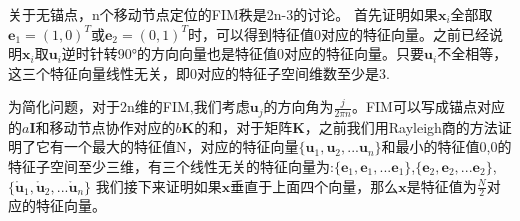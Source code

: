\documentclass[12pt]{article}
\theoremstyle{remark}
\begin{document}
关于无锚点，n个移动节点定位的FIM秩是2n-3的讨论。
首先证明如果$\bm{x}_i$全部取$\bm{e}_1=(1,0)^T$或$\bm{e}_2=(0,1)^T$时，可以得到特征值0对应的特征向量。之前已经说明$\bm{x}_i$取$\bm{u}_i$逆时针转90°的方向向量也是特征值0对应的特征向量。只要$\bm{u}_i$不全相等，这三个特征向量线性无关，即0对应的特征子空间维数至少是3.

为简化问题，对于2n维的FIM,我们考虑$\bm{u}_j$的方向角为$\frac{j}{2\pi n}$。FIM可以写成锚点对应的$a\bm{I}$和移动节点协作对应的$b \bm{K}$的和，对于矩阵$\bm{K}$，之前我们用Rayleigh商的方法证明了它有一个最大的特征值N，对应的特征向量$\{\bm{u}_1,\bm{u}_2,...\bm{u}_n\}$和最小的特征值0,0的特征子空间至少三维，有三个线性无关的特征向量为:$\{\bm{e}_1,\bm{e}_1,...\bm{e}_1\}$,$\{\bm{e}_2,\bm{e}_2,...\bm{e}_2\}$,$\{\mathring{\bm{u}}_1,\mathring{\bm{u}}_2,...\mathring{\bm{u}}_n\}$
我们接下来证明如果$\bm{x}$垂直于上面四个向量，那么$\bm{x}$是特征值为$\frac{N}{2}$对应的特征向量。
\end{document}

